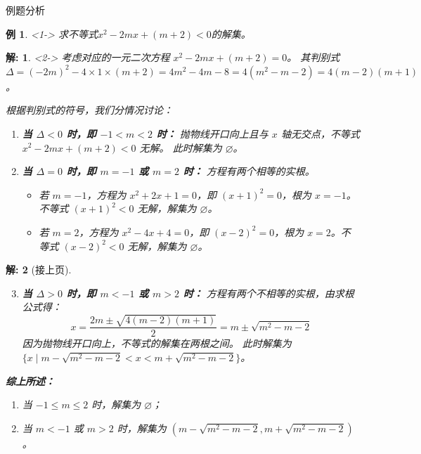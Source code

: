 \documentclass[aspectratio=169,13pt,fleqn,t] {beamer}
\newtheorem*{solve}{解:}
\newtheorem{instance}{例}   %
\begin{document}
\begin{frame}{例题分析}
	\vspace{-1.5em}
\begin{instance}<1->
	求不等式$x^2 - 2mx + (m+2) < 0$的解集。
\end{instance}
	\vspace{-1em}
	\begin{solve}<2->		
		考虑对应的一元二次方程 \(x^2 - 2mx + (m+2) = 0\)。
		其判别式 \(\Delta = (-2m)^2 - 4 \times 1 \times (m+2) = 4m^2 - 4m - 8 = 4(m^2 - m - 2) = 4(m-2)(m+1)\)。
		
		根据判别式的符号，我们分情况讨论：
		
		\begin{enumerate}[(1)]
			\item \textbf{当 \(\Delta < 0\) 时，即 \(-1 < m < 2\) 时：}
			抛物线开口向上且与 \(x\) 轴无交点，不等式 \(x^2 - 2mx + (m+2) < 0\) 无解。
			此时解集为 \(\varnothing\)。
			
			\item \textbf{当 \(\Delta = 0\) 时，即 \(m = -1\) 或 \(m = 2\) 时：}
			方程有两个相等的实根。
			\begin{itemize}
				\item 若 \(m = -1\)，方程为 \(x^2 + 2x + 1 = 0\)，即 \((x+1)^2 = 0\)，根为 \(x = -1\)。不等式 \((x+1)^2 < 0\) 无解，解集为 \(\varnothing\)。
				\item 若 \(m = 2\)，方程为 \(x^2 - 4x + 4 = 0\)，即 \((x-2)^2 = 0\)，根为 \(x = 2\)。不等式 \((x-2)^2 < 0\) 无解，解集为 \(\varnothing\)。
			\end{itemize}
			
		\end{enumerate}
	\end{solve}
\end{frame}

\begin{frame}{}
	\begin{solve}[接上页]
		
		\begin{enumerate}[(3)]
	\setcounter{enumi}{2}
			\item \textbf{当 \(\Delta > 0\) 时，即 \(m < -1\) 或 \(m > 2\) 时：}
		方程有两个不相等的实根，由求根公式得：
		\[
		x = \frac{2m \pm \sqrt{4(m-2)(m+1)}}{2} = m \pm \sqrt{m^2 - m - 2}
		\]
		因为抛物线开口向上，不等式的解集在两根之间。
		此时解集为 \(\{x \mid m - \sqrt{m^2 - m - 2} < x < m + \sqrt{m^2 - m - 2}\}\)。
		\end{enumerate}
			\textbf{综上所述：}
		\begin{enumerate}[(1)]
			\item 当 \(-1 \le m \le 2\) 时，解集为 \(\varnothing\)；
			\item 当 \(m < -1\) 或 \(m > 2\) 时，解集为 \((m - \sqrt{m^2 - m - 2}, m + \sqrt{m^2 - m - 2})\)。
		\end{enumerate}
	\end{solve}
	
\end{frame}
\end{document}
